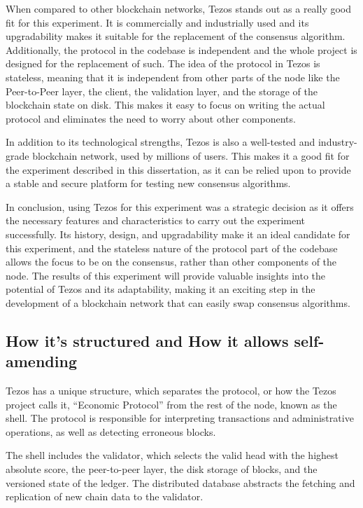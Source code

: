 When compared to other blockchain networks, Tezos stands out as a really good fit for this experiment. It is commercially and industrially used and its upgradability makes it suitable for the replacement of the consensus algorithm. Additionally, the protocol in the codebase is independent and the whole project is designed for the replacement of such. 
The idea of the protocol in Tezos is stateless, meaning that it is independent from other parts of the node like the Peer-to-Peer layer, the client, the validation layer, and the storage of the blockchain state on disk.
This makes it easy to focus on writing the actual protocol and eliminates the need to worry about other components.

In addition to its technological strengths, Tezos is also a well-tested and industry-grade blockchain network, used by millions of users. This makes it a good fit for the experiment described in this dissertation, as it can be relied upon to provide a stable and secure platform for testing new consensus algorithms.


In conclusion, using Tezos for this experiment was a strategic decision as it offers the necessary features and characteristics to carry out the experiment successfully. Its history, design, and upgradability make it an ideal candidate for this experiment, and the stateless nature of the protocol part of the codebase allows the focus to be on the consensus, rather than other components of the node.
The results of this experiment will provide valuable insights into the potential of Tezos and its adaptability, making it an exciting step in the development of a blockchain network that can easily swap consensus algorithms.



\subsection*{How it's structured and How it allows self-amending}

Tezos has a unique structure, which separates the protocol, or how the Tezos project calls it, ``Economic Protocol'' from the rest of the node, known as the shell. 
The protocol is responsible for interpreting transactions and administrative operations, as well as detecting erroneous blocks.

The shell includes the validator, which selects the valid head with the highest absolute score, the peer-to-peer layer, the disk storage of blocks, and the versioned state of the ledger. The distributed database abstracts the fetching and replication of new chain data to the validator.

